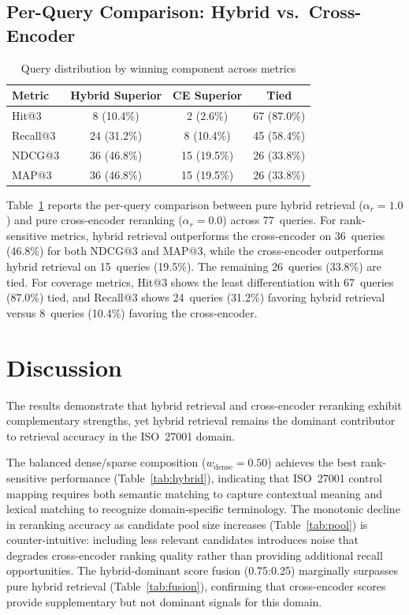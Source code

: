 \documentclass[conference]{IEEEtran}
\begin{document}
\subsection{Per-Query Comparison: Hybrid vs.\ Cross-Encoder}

\begin{table}[H]
\centering
\caption{Query distribution by winning component across metrics}
\label{tab:winner}
\small
\begin{tabular}{lccc}
\toprule
Metric & Hybrid Superior & CE Superior & Tied \\
\midrule
Hit@3    & 8 (10.4\%)  & 2 (2.6\%)  & 67 (87.0\%) \\
Recall@3 & 24 (31.2\%) & 8 (10.4\%) & 45 (58.4\%) \\
NDCG@3   & 36 (46.8\%) & 15 (19.5\%) & 26 (33.8\%) \\
MAP@3    & 36 (46.8\%) & 15 (19.5\%) & 26 (33.8\%) \\
\bottomrule
\end{tabular}
\end{table}

Table~\ref{tab:winner} reports the per-query comparison between pure
hybrid retrieval ($\alpha_r=1.0$) and pure cross-encoder reranking
($\alpha_r=0.0$) across 77~queries. For rank-sensitive metrics, hybrid
retrieval outperforms the cross-encoder on 36~queries (46.8\%) for both
NDCG@3 and MAP@3, while the cross-encoder outperforms hybrid retrieval on
15~queries (19.5\%). The remaining 26~queries (33.8\%) are tied. For
coverage metrics, Hit@3 shows the least differentiation with 67~queries
(87.0\%) tied, and Recall@3 shows 24~queries (31.2\%) favoring hybrid
retrieval versus 8~queries (10.4\%) favoring the cross-encoder.

\section{Discussion}

The results demonstrate that hybrid retrieval and cross-encoder reranking
exhibit complementary strengths, yet hybrid retrieval remains the dominant
contributor to retrieval accuracy in the ISO~27001 domain.

The balanced dense/sparse composition ($w_{\text{dense}}=0.50$) achieves
the best rank-sensitive performance (Table~\ref{tab:hybrid}), indicating
that ISO~27001 control mapping requires both semantic matching to capture
contextual meaning and lexical matching to recognize domain-specific
terminology. The monotonic decline in reranking accuracy as candidate pool
size increases (Table~\ref{tab:pool}) is counter-intuitive: including
less relevant candidates introduces noise that degrades cross-encoder
ranking quality rather than providing additional recall opportunities.
The hybrid-dominant score fusion (0.75:0.25) marginally surpasses pure
hybrid retrieval (Table~\ref{tab:fusion}), confirming that cross-encoder
scores provide supplementary but not dominant signals for this domain.
\end{document}
